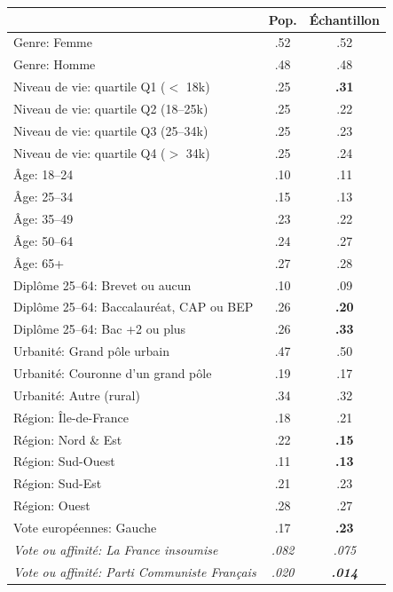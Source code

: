 
\begin{tabular}[t]{lcc}
\toprule
  & Pop. & Échantillon\\
\midrule
Genre: Femme & .52 & .52\\
Genre: Homme & .48 & .48\\
\addlinespace
Niveau de vie: quartile Q1 ($<$ 18k\texteuro{}) & .25 & \textbf{.31}\\
Niveau de vie: quartile Q2 (18--25k\texteuro{})  & .25 & .22\\
Niveau de vie: quartile Q3 (25--34k\texteuro{}) & .25 & .23\\
Niveau de vie: quartile Q4 ($>$ 34k\texteuro{})  & .25 & .24\\
\addlinespace
Âge: 18--24 & .10 & .11\\
Âge: 25--34 & .15 & .13\\
Âge: 35--49 & .23 & .22\\
Âge: 50--64 & .24 & .27\\
Âge: 65+ & .27 & .28\\
\addlinespace
Diplôme 25--64: Brevet ou aucun & .10 & .09\\
Diplôme 25--64: Baccalauréat, CAP ou BEP & .26 & \textbf{.20}\\
Diplôme 25--64: Bac +2 ou plus & .26 & \textbf{.33}\\
\addlinespace
Urbanité: Grand pôle urbain & .47 & .50\\
Urbanité: Couronne d'un grand pôle & .19 & .17\\
Urbanité: Autre (rural) & .34 & .32\\
\addlinespace
Région: Île-de-France & .18 & .21\\
Région: Nord \& Est & .22 & \textbf{.15}\\
Région: Sud-Ouest & .11 & \textbf{.13}\\
Région: Sud-Est & .21 & .23\\
Région: Ouest & .28 & .27\\
\addlinespace
Vote européennes: Gauche & .17 & \textbf{.23}\\
\textit{Vote ou affinité: La France insoumise} & \textit{.082} & \textit{.075} \\ %
\textit{Vote ou affinité: Parti Communiste Français} & \textit{.020} & \textit{\textbf{.014}} \\ %

\end{tabular}
